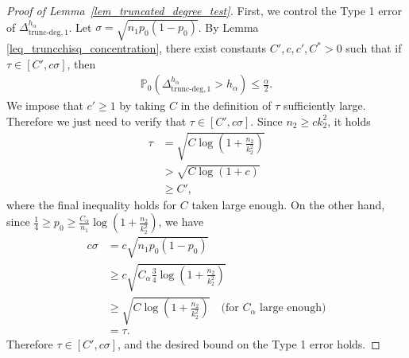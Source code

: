 \documentclass{article}
\newcommand{\bbP}{\mathbb{P}}
\newcommand{\chisqlin}{\text{trunc-deg}}
\begin{document}
\begin{proof}[Proof of Lemma~\ref{lem_truncated_degree_test}]
    First, we control the Type 1 error of $\Delta^{h_\alpha}_{\chisqlin, 1}$. Let $\sigma = \sqrt{n_1p_0(1-p_0)}$. By Lemma \ref{leq_truncchisq_concentration}, there exist constants $C', c, c', C^* > 0$ such that if $\tau \in [C', c\sigma]$, then
    \begin{align*}
    \bbP_0(\Delta^{h_\alpha}_{\chisqlin, 1} > h_\alpha) \leq \frac{\alpha}{2}.
    \end{align*}
    We impose that $c' \geq 1$ by taking $C$ in the definition of $\tau$ sufficiently large. Therefore we just need to verify that $\tau \in [C', c\sigma]$. Since $n_2 \geq ck_2^2$, it holds
    \begin{align*}
        \tau &= \sqrt{C\log(1 + \frac{n_2}{k_2^2})} \\
        &> \sqrt{C\log(1 + c)} \\
        &\geq C',
    \end{align*}
    where the final inequality holds for $C$ taken large enough. On the other hand, since $\frac14 \geq p_0 \geq \frac{C_\alpha}{n_1}\log\left(1 + \frac{n_2}{k_2^2}\right)$, we have
    \begin{align*}
        c\sigma &= c\sqrt{n_1p_0(1-p_0)} \\
        &\geq c\sqrt{C_\alpha \frac34 \log\left(1 + \frac{n_2}{k_2^2}\right)} \\
        &\geq \sqrt{C\log\left(1 + \frac{n_2}{k_2^2}\right)} \quad \text{(for $C_\alpha$ large enough)}\\
        &= \tau.
    \end{align*}
    Therefore $\tau \in [C', c\sigma]$, and the desired bound on the Type 1 error holds.


\end{proof}
\end{document}
